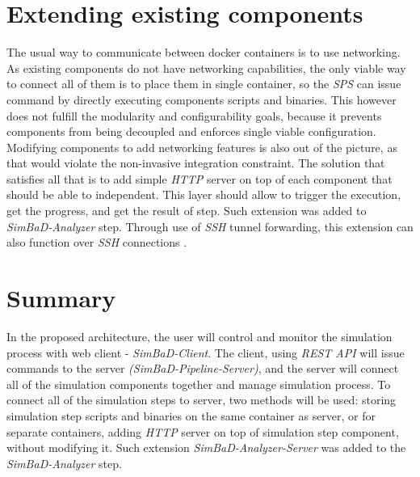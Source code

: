 \section{Extending existing components}
The usual way to communicate between docker containers is to use networking. As existing components do not have networking capabilities, the only viable way to connect all of them is to place them in single container, so the \textit{SPS} can issue command by directly executing components scripts and binaries. This however does not fulfill the modularity and configurability goals, because it prevents components from being decoupled and enforces single viable configuration. Modifying components to add networking features is also out of the picture, as that would violate the non-invasive integration constraint. The solution that satisfies all that is to add simple \textit{HTTP} server on top of each component that should be able to independent. This layer should allow to trigger the execution, get the progress, and get the result of step. Such extension was added to \textit{SimBaD-Analyzer} step. Through use of \textit{SSH} tunnel forwarding, this extension can also function over \textit{SSH} connections \cite{SSHTunnel}.
\section{Summary}
In the proposed architecture, the user will control and monitor the simulation process with web client - \textit{SimBaD-Client}. The client, using \textit{REST API} will issue commands to the server \textit{(SimBaD-Pipeline-Server)}, and the server will connect all of the simulation components together and manage simulation process. To connect all of the simulation steps to server, two methods will be used: storing simulation step scripts and binaries on the same container as server, or for separate containers, adding \textit{HTTP} server on top of simulation step component, without modifying it. Such extension \textit{SimBaD-Analyzer-Server} was added to the \textit{SimBaD-Analyzer} step.